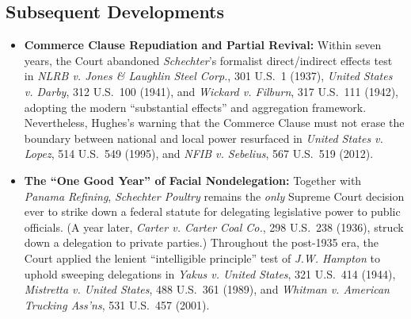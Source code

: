 \documentclass[12pt]{article}
\begin{document}
\subsection{Subsequent Developments}

\begin{itemize}
  \item \textbf{Commerce Clause Repudiation and Partial Revival:} Within seven years, the Court abandoned \textit{Schechter}'s formalist direct/indirect effects test in \textit{NLRB v. Jones \& Laughlin Steel Corp.}, 301 U.S.\ 1 (1937), \textit{United States v. Darby}, 312 U.S.\ 100 (1941), and \textit{Wickard v. Filburn}, 317 U.S.\ 111 (1942), adopting the modern ``substantial effects'' and aggregation framework. Nevertheless, Hughes's warning that the Commerce Clause must not erase the boundary between national and local power resurfaced in \textit{United States v. Lopez}, 514 U.S.\ 549 (1995), and \textit{NFIB v. Sebelius}, 567 U.S.\ 519 (2012).
  \item \textbf{The ``One Good Year'' of Facial Nondelegation:} Together with \textit{Panama Refining}, \textit{Schechter Poultry} remains the \textit{only} Supreme Court decision ever to strike down a federal statute for delegating legislative power to public officials. (A year later, \textit{Carter v. Carter Coal Co.}, 298 U.S.\ 238 (1936), struck down a delegation to private parties.) Throughout the post-1935 era, the Court applied the lenient ``intelligible principle'' test of \textit{J.W. Hampton} to uphold sweeping delegations in \textit{Yakus v. United States}, 321 U.S.\ 414 (1944), \textit{Mistretta v. United States}, 488 U.S.\ 361 (1989), and \textit{Whitman v. American Trucking Ass'ns}, 531 U.S.\ 457 (2001).


\end{itemize}
\end{document}
